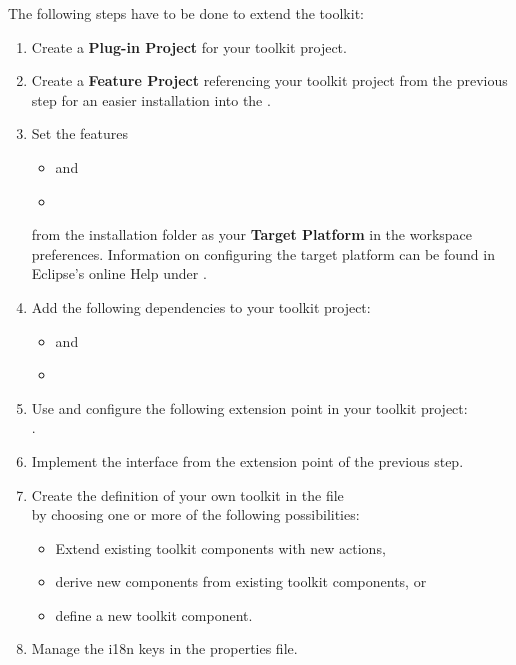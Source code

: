 The following steps have to be done to extend the \ite{} toolkit:
\begin{enumerate}
 \item Create a \textbf{Plug-in Project} for your toolkit project.
 \item Create a \textbf{Feature Project} referencing your toolkit project from
 the previous step for an easier installation into the \ite{}.
 \item Set the features
       \begin{itemize}
        \item {} and
        \item {}
       \end{itemize}
       from the installation folder as
       your \textbf{Target Platform} in the workspace preferences. Information
       on configuring the target platform can be found in Eclipse's online Help
       under .
 \item Add the following dependencies to your toolkit project:
       \begin{itemize}
        \item {} and
        \item {}
       \end{itemize}
 \item Use and configure the following extension point in your toolkit
       project:\\
       .
 \item Implement the interface  from the extension
 point of the previous step.
 \item Create the definition of your own toolkit in the file\\
        by choosing one or more of the following
       possibilities:
       \begin{itemize}
        \item Extend existing toolkit components with new actions,
        \item derive new components from existing toolkit components, or
        \item define a new toolkit component.
       \end{itemize}
 \item Manage the i18n keys in the properties file.
\end{enumerate}

